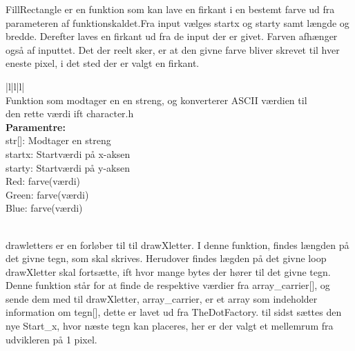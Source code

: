 FillRectangle er en funktion som kan lave en firkant i en bestemt farve ud fra parameteren af funktionskaldet.Fra input vælges startx og starty samt længde og bredde. Derefter laves en firkant ud fra de input der er givet. Farven afhænger også af inputtet. Det der reelt sker, er at den givne farve bliver skrevet til hver eneste pixel, i det sted der er valgt en firkant. 

\begin{center}
\begin{tabular}{ |l|l|l| }
\hline
{} \\
\hline
Funktion som modtager en en streng, og konverterer ASCII værdien til \\den rette værdi ift character.h \\
\hline
\textbf{Paramentre:}  \\str[]: Modtager en streng\\  startx: Startværdi på x-aksen \\starty: Startværdi på y-aksen\\ Red: farve(værdi)\\ Green: farve(værdi) \\ Blue: farve(værdi)\\
\\

\hline
\end{tabular}
\end{center}  

drawletters er en forløber til til drawXletter. I denne funktion, findes længden på det givne tegn, som skal skrives. Herudover findes lægden på det givne loop drawXletter skal fortsætte, ift hvor mange bytes der hører til det givne tegn. Denne funktion står for at finde de respektive værdier fra array\_carrier[], og sende dem med til drawXletter, array\_carrier, er et array som indeholder information om tegn[], dette er lavet ud fra TheDotFactory\cite{TheDot}.  til sidst sættes den nye Start\_x, hvor næste tegn kan placeres, her er der valgt et mellemrum fra udvikleren på 1 pixel.

